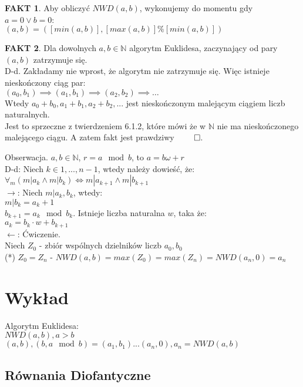 \documentclass{article}
\theoremstyle{definition}
\theoremstyle{definition}
\theoremstyle{definition}
\theoremstyle{definition}
\newtheorem*{fakt}{FAKT}
\begin{document}
\begin{fakt}
    Aby obliczyć $NWD(a,b)$, wykonujemy do momentu gdy $a=0 \lor b=0$:\\
    $(a,b)=([min(a,b)],[max(a,b)] \% [min(a,b)])$
\end{fakt}

\begin{fakt}
    Dla dowolnych $a,b\in\mathbb{N}$ algorytm Euklidesa, 
    zaczynający od pary $(a,b)$ zatrzymuje się.\\
    D-d. Zakładamy nie wprost, że algorytm nie zatrzymuje się. 
    Więc istnieje nieskończony ciąg par:\\
    $(a_0,b_1)\implies(a_1,b_1)\implies(a_2,b_2)\implies\dots$\\
    Wtedy $a_0+b_0, a_1+b_1, a_2+b_2, ...$ jest nieskończonym malejącym ciągiem liczb naturalnych.\\
    Jest to sprzeczne z twierdzeniem 6.1.2, które mówi że w $\mathbb{N}$ nie ma nieskończonego malejącego ciągu.
    A zatem fakt jest prawdziwy $\qed$.
\end{fakt}

Obserwacja. $a,b\in\mathbb{N}$, $r=a \mod b$, to $a=b\omega + r$\\
D-d: Niech $k\in{1,...,n-1}$, wtedy należy dowieść, że:\\
$\forall_{m} (m|a_k \land m| b_k) \iff m|a_{k+1} \land m|b_{k+1}$\\
$\rightarrow$: Niech $m|a_k,b_k$, wtedy:\\
$m|b_k=a_k+1$\\
$b_{k+1}=a_k\mod b_k$. Istnieje liczba naturalna $w$, taka że:\\
$a_k=b_k\cdot w + b_{k+1}$\\
$\leftarrow$: Ćwiczenie.\\

Niech $Z_0$ - zbiór wspólnych dzielników liczb $a_0,b_0$\\
(*) $Z_0=Z_n$ - $NWD(a,b)=max(Z_0)=max(Z_n)=NWD(a_n,0)=a_n$


\section{Wykład}

Algorytm Euklidesa:\\
$NWD(a,b), a>b$\\
$(a,b),(b, a \mod b)=(a_1,b_1)...(a_n,0), a_n=NWD(a,b)$

\subsection{Równania Diofantyczne}
\end{document}
